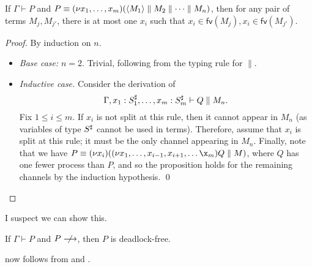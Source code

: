 \documentclass[orivec,envcountsame]{llncs}
\begin{document}
\begin{lemma}\label{thm:procs-share-one-channel}
  If $\Gamma \vdash P$ and $P \equiv (\nu x_1,\dots,x_m)(\langle M_1 \rangle \parallel M_2 \parallel
  \dots \parallel M_n)$, then for any pair of terms $M_j,M_{j'}$, there is at most one $x_i$ such
  that $x_i \in \mathsf{fv}(M_j),x_i \in \mathsf{fv}(M_{j'})$.
\end{lemma}

\begin{proof}
  By induction on $n$.
  \begin{itemize}
  \item \textit{Base case:} $n = 2$.  Trivial, following from the typing rule for $\parallel$.
  \item \textit{Inductive case.} Consider the derivation of
    \[ \Gamma,x_1:S_1^\sharp,\dots,x_m:S_m^\sharp \vdash Q \parallel M_n. \] Fix $1 \leq i
    \leq m$.  If $x_i$ is not split at this rule, then it cannot appear in $M_n$ (as variables of
    type $S^\sharp$ cannot be used in terms).  Therefore, assume that $x_i$ is split at this
    rule; it must be the only channel appearing in $M_n$.  Finally, note that we have $P \equiv (\nu
    x_i)((\nu x_1,\dots,x_{i-1},x_{i+1},\dots\x_m)Q \parallel M)$, where $Q$ has one fewer process
    than $P$, and so the proposition holds for the remaining channels by the induction
    hypothesis. \qed
  \end{itemize}
\end{proof}

I suspect we can show this.

\begin{lemma}\label{thm:typed-stuck-df}
  If $\Gamma \vdash P$ and $P \centernot\ceval$, then $P$ is deadlock-free.
\end{lemma}

 now follows from  and .
\end{document}
